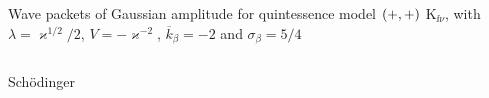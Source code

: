 \documentclass[9pt]{beamer}
\begin{document}
\begin{frame}%
{Wave packets of Gaussian amplitude for quintessence model ${\left(+,+\right)}$}%
{$\mathrm{K}_{\ii\nu}$, with $\lambda = \varkappa^{1/2}/2$,
$V = -\varkappa^{-2}$, $\overline{k}_\beta = -2$ and $\sigma_\beta = 5/4$}
\begin{columns}
\begin{column}{.49\textwidth}
\begin{block}{Schödinger}

\end{block}
\end{column}
\end{columns}
\end{frame}
\end{document}
